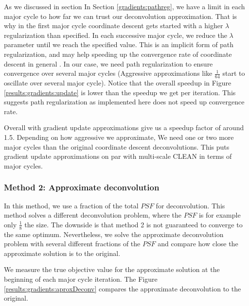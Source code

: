 As we discussed in section In Section \ref{gradients:pathreg}, we have a limit in each major cycle to how far we can trust our deconvolution approximation. That is why in the first major cycle coordinate descent gets started with a higher $\lambda$ regularization than specified. In each successive major cycle, we reduce the $\lambda$ parameter until we reach the specified value. This is an implicit form of path regularization, and may help speeding up the convergence rate of coordinate descent in general \cite{friedman2010regularization}. In our case, we need path regularization to ensure convergence over several major cycles (Aggressive approximations like $\frac{1}{64}$ start to oscillate over several major cycle). Notice that the overall speedup in Figure \ref{results:gradients:update} is lower than the speedup we get per iteration. This suggests path regularization as implemented here does not speed up convergence rate.

Overall with gradient update approximations give us a speedup factor of around 1.5. Depending on how aggressive we approximate, We need one or two more major cycles than the original coordinate descent deconvolutions. This puts gradient update approximations on par with multi-scale CLEAN in terms of major cycles. 

\subsubsection{Method 2: Approximate deconvolution}
In this method, we use a fraction of the total $PSF$ for deconvolution. This method solves a different deconvolution problem, where the $PSF$ is for example only $\frac{1}{8}$ the size. The downside is that method 2 is not guaranteed to converge to the same optimum. Nevertheless, we solve the approximate deconvolution problem with several different fractions of the $PSF$ and compare how close the approximate solution is to the original.

We measure the true objective value for the approximate solution at the beginning of each major cycle iteration. The Figure \ref{results:gradients:aproxDeconv} compares the approximate deconvolution to the original.

